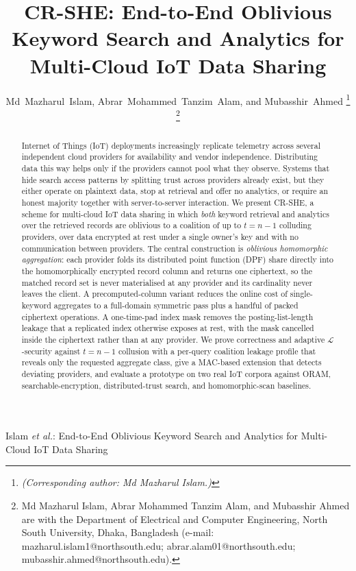 \documentclass[journal]{IEEEtran}
\newcommand{\Leak}{\mathcal{L}}
\begin{document}
\title{CR-SHE: End-to-End Oblivious Keyword Search and Analytics for Multi-Cloud IoT Data Sharing}

\author{Md~Mazharul~Islam,
Abrar~Mohammed~Tanzim~Alam,
and Mubasshir~Ahmed%
\thanks{\textit{(Corresponding author: Md Mazharul Islam.)}}%
\thanks{Md Mazharul Islam, Abrar Mohammed Tanzim Alam, and Mubasshir Ahmed are with the Department of Electrical and Computer Engineering, North South University, Dhaka, Bangladesh (e-mail: mazharul.islam1@northsouth.edu; abrar.alam01@northsouth.edu; mubasshir.ahmed@northsouth.edu).}}

%
{Islam \MakeLowercase{\textit{et al.}}: End-to-End Oblivious Keyword Search and Analytics for Multi-Cloud IoT Data Sharing}

\maketitle

\begin{abstract}
Internet of Things (IoT) deployments increasingly replicate telemetry across several independent cloud providers for availability and vendor independence. Distributing data this way helps only if the providers cannot pool what they observe. Systems that hide search access patterns by splitting trust across providers already exist, but they either operate on plaintext data, stop at retrieval and offer no analytics, or require an honest majority together with server-to-server interaction. We present CR-SHE, a scheme for multi-cloud IoT data sharing in which \emph{both} keyword retrieval and analytics over the retrieved records are oblivious to a coalition of up to $t=n-1$ colluding providers, over data encrypted at rest under a single owner's key and with no communication between providers. The central construction is \emph{oblivious homomorphic aggregation}: each provider folds its distributed point function (DPF) share directly into the homomorphically encrypted record column and returns one ciphertext, so the matched record set is never materialised at any provider and its cardinality never leaves the client. A precomputed-column variant reduces the online cost of single-keyword aggregates to a full-domain symmetric pass plus a handful of packed ciphertext operations. A one-time-pad index mask removes the posting-list-length leakage that a replicated index otherwise exposes at rest, with the mask cancelled inside the ciphertext rather than at any provider. We prove correctness and adaptive $\Leak$-security against $t=n-1$ collusion with a per-query coalition leakage profile that reveals only the requested aggregate class, give a MAC-based extension that detects deviating providers, and evaluate a prototype on two real IoT corpora against ORAM, searchable-encryption, distributed-trust search, and homomorphic-scan baselines.
\end{abstract}
\end{document}

